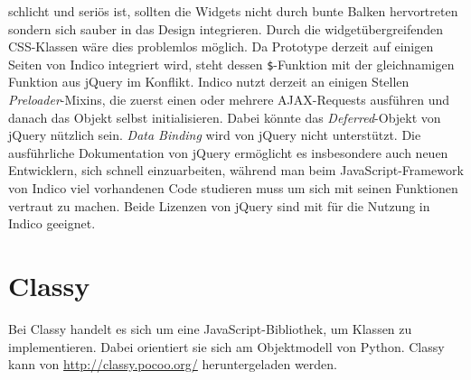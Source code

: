 schlicht und seriös ist, sollten die Widgets nicht durch bunte Balken hervortreten sondern sich
sauber in das Design integrieren. Durch die widgetübergreifenden CSS-Klassen wäre dies problemlos
möglich. Da Prototype derzeit auf einigen Seiten von Indico integriert wird, steht dessen
\lstinline{$}-Funktion mit der gleichnamigen Funktion aus jQuery im Konflikt. Indico nutzt derzeit
an einigen Stellen \emph{Preloader}-Mixins, die zuerst einen oder mehrere AJAX-Requests ausführen
und danach das Objekt selbst initialisieren. Dabei könnte das \emph{Deferred}-Objekt von jQuery
nützlich sein. \emph{Data Binding} wird von jQuery nicht unterstützt. Die ausführliche Dokumentation
von jQuery ermöglicht es insbesondere auch neuen Entwicklern, sich schnell einzuarbeiten, während
man beim JavaScript-Framework von Indico viel vorhandenen Code studieren muss um sich mit seinen
Funktionen vertraut zu machen. Beide Lizenzen von jQuery sind mit für die Nutzung in Indico
geeignet.






\section{Classy}
Bei Classy handelt es sich um eine JavaScript-Bibliothek, um Klassen zu implementieren. Dabei
orientiert sie sich am Objektmodell von Python. Classy kann von
\href{http://classy.pocoo.org/}{http://classy.pocoo.org/} heruntergeladen werden.

